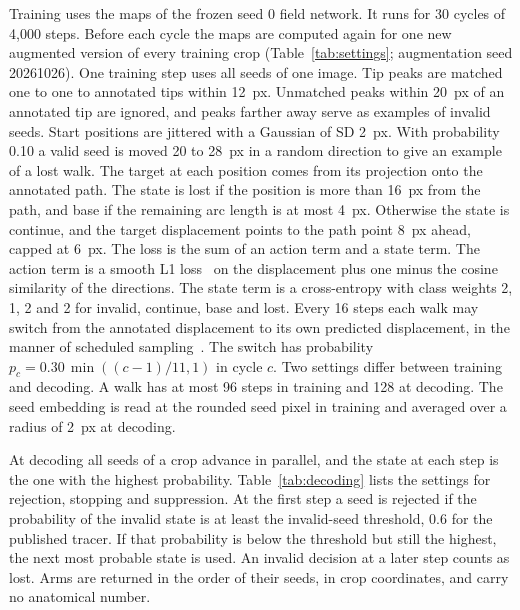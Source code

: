 Training uses the maps of the frozen seed 0 field network.
It runs for 30 cycles of 4,000 steps.
Before each cycle the maps are computed again for one new augmented version of every training crop (Table~\ref{tab:settings}; augmentation seed 20261026).
One training step uses all seeds of one image.
Tip peaks are matched one to one to annotated tips within 12~px.
Unmatched peaks within 20~px of an annotated tip are ignored, and peaks farther away serve as examples of invalid seeds.
Start positions are jittered with a Gaussian of SD 2~px.
With probability 0.10 a valid seed is moved 20 to 28~px in a random direction to give an example of a lost walk.
The target at each position comes from its projection onto the annotated path.
The state is lost if the position is more than 16~px from the path, and base if the remaining arc length is at most 4~px.
Otherwise the state is continue, and the target displacement points to the path point 8~px ahead, capped at 6~px.
The loss is the sum of an action term and a state term.
The action term is a smooth L1 loss~\cite{girshick2015fast} on the displacement plus one minus the cosine similarity of the directions.
The state term is a cross-entropy with class weights 2, 1, 2 and 2 for invalid, continue, base and lost.
Every 16 steps each walk may switch from the annotated displacement to its own predicted displacement, in the manner of scheduled sampling~\cite{bengio2015scheduled}.
The switch has probability $p_c = 0.30\,\min((c-1)/11, 1)$ in cycle $c$.
Two settings differ between training and decoding.
A walk has at most 96 steps in training and 128 at decoding.
The seed embedding is read at the rounded seed pixel in training and averaged over a radius of 2~px at decoding.

At decoding all seeds of a crop advance in parallel, and the state at each step is the one with the highest probability.
Table~\ref{tab:decoding} lists the settings for rejection, stopping and suppression.
At the first step a seed is rejected if the probability of the invalid state is at least the invalid-seed threshold, 0.6 for the published tracer.
If that probability is below the threshold but still the highest, the next most probable state is used.
An invalid decision at a later step counts as lost.
Arms are returned in the order of their seeds, in crop coordinates, and carry no anatomical number.

